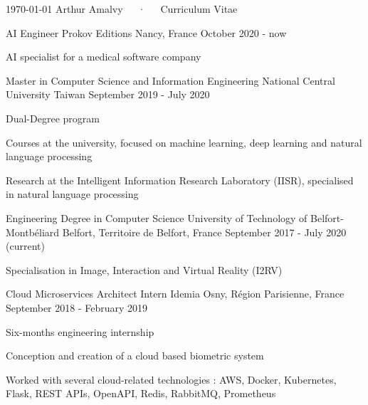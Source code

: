 \documentclass[11pt, a4paper]{awesome-cv}
\begin{document}
\makecvheader

\makecvfooter
  {\today}
  {Arthur Amalvy~~~·~~~Curriculum Vitae}
  {\thepage}



\begin{cventries}

  \cventry
  {AI Engineer}
  {Prokov Editions}
  {Nancy, France}
  {October 2020 - now}
  {
    \begin{cvitems}
      \item AI specialist for a medical software company
    \end{cvitems}
  }

  \cventry
  {Master in Computer Science and Information Engineering} %
  {National Central University} %
  {Taiwan} %
  {September 2019 - July 2020} %
  {
    \begin{cvitems} %
      \item Dual-Degree program
      \item Courses at the university, focused on machine learning, deep learning and natural language processing
      \item Research at the Intelligent Information Research Laboratory (IISR), specialised in natural language processing
    \end{cvitems}
  }

  \cventry
  {Engineering Degree in Computer Science}
  {University of Technology of Belfort-Montbéliard}
  {Belfort, Territoire de Belfort, France}
  {September 2017 - July 2020 (current)}
  {
    \begin{cvitems}
      \item Specialisation in Image, Interaction and Virtual Reality (I2RV)
    \end{cvitems}
  }

  \cventry
  {Cloud Microservices Architect Intern}
  {Idemia}
  {Osny, Région Parisienne, France}
  {September 2018 - February 2019}
  {
    \begin{cvitems}
      \item Six-months engineering internship 
      \item Conception and creation of a cloud based biometric system
      \item Worked with several cloud-related technologies : AWS, Docker, Kubernetes, Flask, REST APIs, OpenAPI, Redis, RabbitMQ, Prometheus
    \end{cvitems}
  }


\end{cventries}
\end{document}
